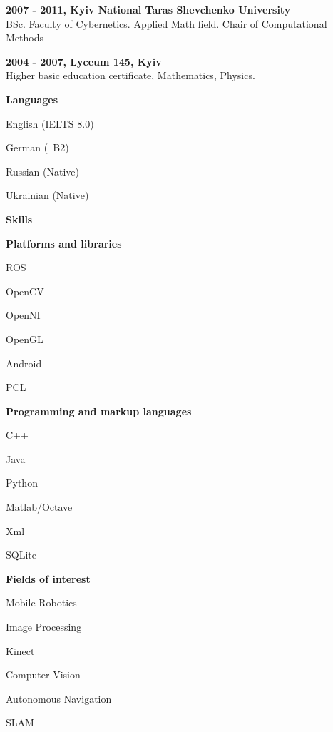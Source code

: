 \documentclass[a4paper,12pt,final]{memoir}
\newcommand{\Sep}{\vspace{1.5em}}
\newcommand{\SmallSep}{\vspace{0.5em}}
\newcommand{\CVSection}[1]
	{\Large\textbf{#1}\par
	\SmallSep\normalsize\normalfont}
\newcommand{\CVItem}[1]
	{\textbf{\color{MidnightBlue} #1}}
\begin{document}
\CVItem{2007 - 2011, Kyiv National Taras Shevchenko University}\\
BSc. Faculty of Cybernetics. Applied Math field. 
\newline Chair of Computational Methods
\SmallSep

\CVItem{2004 - 2007, Lyceum 145, Kyiv}\\
Higher basic education certificate, Mathematics, Physics.
\Sep
\clearpage
\framebreak
\framebreak


\CVSection{Languages}
\begin{compactitem}[\color{MidnightBlue}$\circ$]
	\item English (IELTS 8.0)
	\item German (~B2) 
	\item Russian (Native) 
	\item Ukrainian (Native)
\end{compactitem}
\Sep
\CVSection{Skills}
\CVItem{Platforms and libraries}
\begin{multicols}{3}
\begin{compactitem}[\color{MidnightBlue}$\circ$]
	\item ROS 
	\item OpenCV
	\item OpenNI 
	\item OpenGL
	\item Android
	\item PCL
\end{compactitem}
\end{multicols}
\SmallSep

\CVItem{Programming and markup languages}
\begin{multicols}{3}
\begin{compactitem}[\color{MidnightBlue}$\circ$]
	\item C++ 
	\item Java 
	\item Python 
	\item Matlab/Octave 
	\item Xml
	\item SQLite
\end{compactitem}
\end{multicols}
\SmallSep

\CVItem{Fields of interest}
\begin{compactitem}[\color{MidnightBlue}$\circ$]
	\item Mobile Robotics
	\item Image Processing 
	\item Kinect 
	\item Computer Vision 
	\item Autonomous Navigation
	\item SLAM
\end{compactitem}
\Sep 
\end{document}
